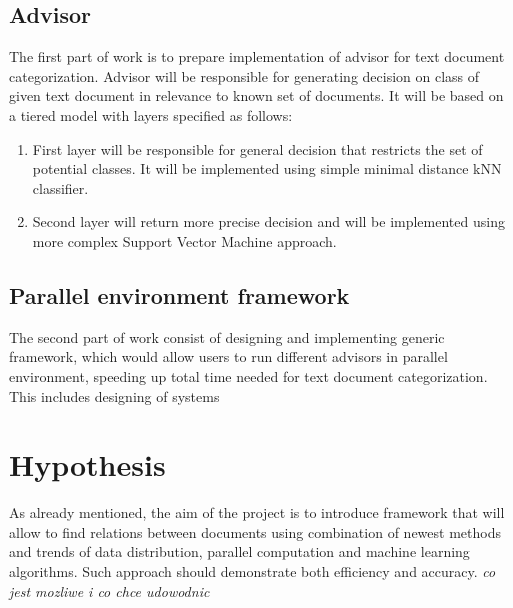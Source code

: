 \subsection{Advisor}
The first part of work is to prepare implementation of advisor for text document categorization. Advisor will be responsible for generating decision on class of given text document in relevance to known set of documents. It will be based on a tiered model with layers specified as follows:
\begin{enumerate}
\item First layer will be responsible for general decision that restricts the set of potential classes. It will be implemented using simple minimal distance kNN classifier.
\item Second layer will return more precise decision and will be implemented using more complex Support Vector Machine approach.
\end{enumerate}
	
\subsection{Parallel environment framework}
The second part of work consist of designing and implementing generic framework, which would allow users to run different advisors in parallel environment, speeding up total time needed for text document categorization. This includes designing of systems 

\section{Hypothesis}
\label{hypo}
As already mentioned, the aim of the project is to introduce framework that will allow to find relations between documents using combination of newest methods and trends of data distribution, parallel computation and machine learning algorithms. Such approach should demonstrate both efficiency and accuracy.
\textit{co jest mozliwe i co chce udowodnic}

